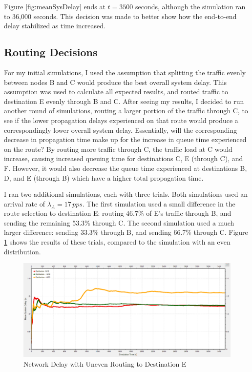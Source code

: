 \documentclass{article}
\begin{document}
Figure \ref{fig:meanSysDelay} ends at $t=3500$ seconds, although the simulation ran to 36,000 seconds.  
This decision was made to better show how the end-to-end delay stabilized as time increased.

\subsection{Routing Decisions}
For my initial simulations, I used the assumption that splitting the traffic evenly between nodes B and C would produce the best overall system delay.
This assumption was used to calculate all expected results, and routed traffic to destination E evenly through B and C.
After seeing my results, I decided to run another round of simulations, routing a larger portion of the traffic through C, to see if the lower propagation delays experienced on that route would produce a correspondingly lower overall system delay.
Essentially, will the corresponding decrease in propagation time make up for the increase in queue time experienced on the route?
By routing more traffic through C, the traffic load at C would increase, causing increased queuing time for destinations C, E (through C), and F.  
However, it would also decrease the queue time experienced at destinations B, D, and E (through B) which have a higher total propagation time.

I ran two additional simulations, each with three trials.
Both simulations used an arrival rate of $\lambda_A = 17 \, pps$.
The first simulation used a small difference in the route selection to destination E:  routing 46.7\% of E's traffic through B, and sending the remaining 53.3\% through C. 
The second simulation used a much larger difference:  sending 33.3\% through B, and sending 66.7\% through C.
Figure \ref{fig:unevenDelay} shows the results of these trials, compared to the simulation with an even distribution.

\begin{figure}[h!]
\centering
\includegraphics[scale=0.5]{Images/UnevenDist.PNG}
\caption{Network Delay with Uneven Routing to Destination E}
\label{fig:unevenDelay}
\end{figure}
\end{document}
